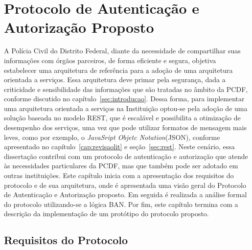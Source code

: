 \chapter{Protocolo de Autenticação e Autorização Proposto}\label{cap:Protocolo}



A Polícia Civil do Distrito Federal, diante da necessidade de compartilhar suas informações com órgãos parceiros, de forma eficiente e segura, objetiva estabelecer uma arquitetura de referência para a adoção de uma arquitetura orientada a serviços. Essa arquitetura deve primar pela segurança, dada a criticidade e sensibilidade das informações que são tratadas no âmbito da PCDF, conforme discutido no capítulo~\ref{sec:introducao}.
Dessa forma, para implementar uma arquitetura orientada a serviços na Instituição optou-se pela adoção de uma solução baseada no modelo REST, que é escalável e possibilita a otimização de desempenho dos serviços, uma vez que pode utilizar formatos de mensagem mais leves, como por exemplo, o \emph{JavaSript Objetc Notation}(JSON), conforme apresentado no capítulo~\ref{cap:revisaolit} e seção~\ref{sec:rest}. Neste cenário, essa dissertação contribui com um protocolo de autenticação e autorização que atende às necessidades particulares da PCDF, mas que também pode ser adotado em outras instituições. Este capítulo inicia com a apresentação dos requisitos do protocolo e de sua arquitetura, onde é apresentada uma visão geral do Protocolo de Autenticação e Autorização proposto. Em seguida é realizada a análise formal do protocolo utilizando-se a lógica BAN. Por fim, este capítulo termina com a descrição da implementação de um protótipo do protocolo proposto.


\section{Requisitos do Protocolo}\label{sec:reqprotocolo}

